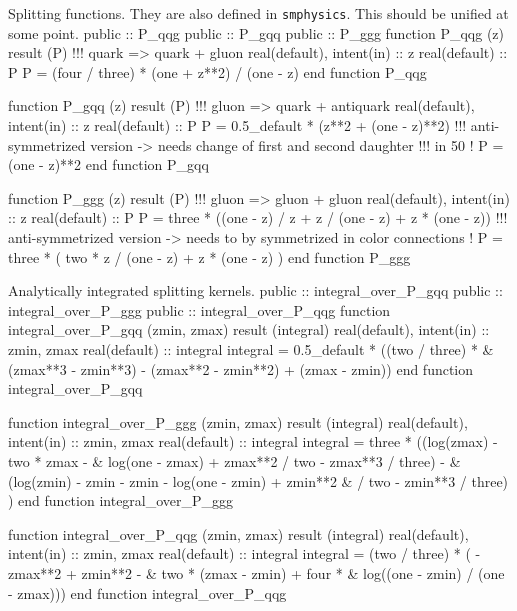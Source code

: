 \eatline
\nwendcode{}Splitting functions. They are also defined in {\tt{}sm{}physics}. This
should be unified at some point.
\nwenddocs{}\plusendmoddef
  public :: P_qqg
  public :: P_gqq
  public :: P_ggg
\nwendcode{}\plusendmoddef
  function P_qqg (z) result (P)
    !!! quark => quark + gluon
    real(default), intent(in) :: z
    real(default) :: P
    P = (four / three) * (one + z**2) / (one - z)
  end function P_qqg

  function P_gqq (z) result (P)
    !!! gluon => quark + antiquark
    real(default), intent(in) :: z
    real(default) :: P
    P = 0.5_default * (z**2 + (one - z)**2)
    !!! anti-symmetrized version -> needs change of first and second daughter
    !!! in 50%
    !    P = (one - z)**2
  end function P_gqq

  function P_ggg (z) result (P)
    !!! gluon => gluon + gluon
    real(default), intent(in) :: z
    real(default) :: P
    P = three * ((one - z) / z + z / (one - z) + z * (one - z))
    !!! anti-symmetrized version -> needs to by symmetrized in color connections
    !    P = three * ( two * z / (one - z) + z * (one - z) )
  end function P_ggg

\eatline
\nwendcode{}Analytically integrated splitting kernels.
\nwenddocs{}\plusendmoddef
  public :: integral_over_P_gqq
  public :: integral_over_P_ggg
  public :: integral_over_P_qqg
\nwendcode{}\plusendmoddef
  function integral_over_P_gqq (zmin, zmax) result (integral)
    real(default), intent(in) :: zmin, zmax
    real(default) :: integral
    integral = 0.5_default * ((two / three) * &
         (zmax**3 - zmin**3) - (zmax**2 - zmin**2) + (zmax - zmin))
  end function integral_over_P_gqq

  function integral_over_P_ggg (zmin, zmax) result (integral)
    real(default), intent(in) :: zmin, zmax
    real(default) :: integral
    integral = three * ((log(zmax) - two * zmax - &
         log(one - zmax) + zmax**2 / two - zmax**3 / three) - &
         (log(zmin) - zmin - zmin - log(one - zmin) + zmin**2 &
         / two - zmin**3 / three) )
  end function integral_over_P_ggg

  function integral_over_P_qqg (zmin, zmax) result (integral)
    real(default), intent(in) :: zmin, zmax
    real(default) :: integral
    integral = (two / three) * ( - zmax**2 + zmin**2 - &
         two * (zmax - zmin) + four * &
         log((one - zmin) / (one - zmax)))
  end function integral_over_P_qqg

